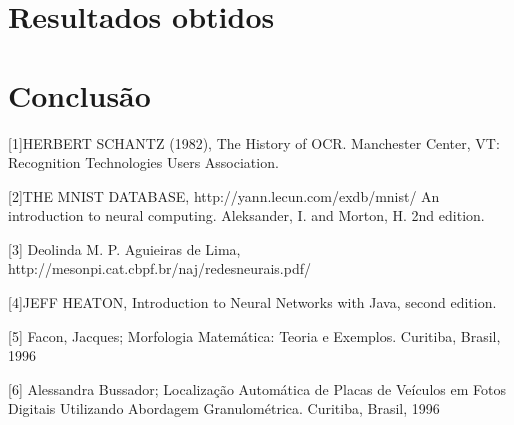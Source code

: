 \documentclass[
	article,			%
	11pt,				%
	oneside,			%
	a4paper,			%
	english,			%
	brazil,				%
	sumario=tradicional
	]{abntex2}
\begin{document}
\section{Resultados obtidos}
\section{Conclusão}
\begin{thebibliography}{1}

[1]HERBERT SCHANTZ (1982), The History of OCR. Manchester Center, VT: Recognition Technologies Users Association.

[2]THE MNIST DATABASE, http://yann.lecun.com/exdb/mnist/ An introduction to neural computing. Aleksander, I. and Morton, H. 2nd edition.

[3] Deolinda M. P. Aguieiras de Lima, http://mesonpi.cat.cbpf.br/naj/redesneurais.pdf/

[4]JEFF HEATON, Introduction to Neural Networks with Java, second edition.

[5] Facon, Jacques; Morfologia Matemática: Teoria e Exemplos. Curitiba,
 Brasil, 1996

[6] Alessandra Bussador; Localização Automática de Placas de Veículos em Fotos
Digitais Utilizando Abordagem Granulométrica. Curitiba,
 Brasil, 1996
\end{thebibliography}
\end{document}
